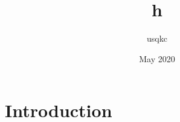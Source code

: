 \documentclass{article}
\title{h}
\author{usqkc }
\date{May 2020}
\begin{document}
\maketitle

\section{Introduction}
\end{document}
